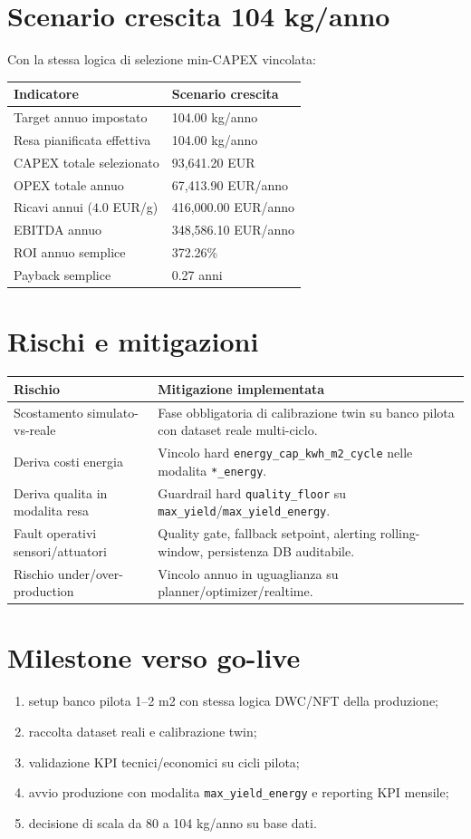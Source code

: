 \documentclass[11pt,a4paper]{article}
\begin{document}
\section*{Scenario crescita 104 kg/anno}
Con la stessa logica di selezione min-CAPEX vincolata:
\begin{longtable}{@{}p{6.6cm}p{5.6cm}@{}}
\toprule
Indicatore & Scenario crescita \\ \midrule
Target annuo impostato & 104.00 kg/anno \\
Resa pianificata effettiva & 104.00 kg/anno \\
CAPEX totale selezionato & 93,641.20 EUR \\
OPEX totale annuo & 67,413.90 EUR/anno \\
Ricavi annui (\(4.0\) EUR/g) & 416,000.00 EUR/anno \\
EBITDA annuo & 348,586.10 EUR/anno \\
ROI annuo semplice & 372.26\% \\
Payback semplice & 0.27 anni \\
\bottomrule
\end{longtable}

\section*{Rischi e mitigazioni}
\begin{longtable}{@{}p{4.0cm}p{7.8cm}@{}}
\toprule
Rischio & Mitigazione implementata \\ \midrule
Scostamento simulato-vs-reale & Fase obbligatoria di calibrazione twin su banco pilota con dataset reale multi-ciclo. \\
Deriva costi energia & Vincolo hard \texttt{energy\_cap\_kwh\_m2\_cycle} nelle modalita \texttt{*\_energy}. \\
Deriva qualita in modalita resa & Guardrail hard \texttt{quality\_floor} su \texttt{max\_yield}/\texttt{max\_yield\_energy}. \\
Fault operativi sensori/attuatori & Quality gate, fallback setpoint, alerting rolling-window, persistenza DB auditabile. \\
Rischio under/over-production & Vincolo annuo in uguaglianza su planner/optimizer/realtime. \\
\bottomrule
\end{longtable}

\section*{Milestone verso go-live}
\begin{enumerate}
  \item setup banco pilota 1--2 m2 con stessa logica DWC/NFT della produzione;
  \item raccolta dataset reali e calibrazione twin;
  \item validazione KPI tecnici/economici su cicli pilota;
  \item avvio produzione con modalita \texttt{max\_yield\_energy} e reporting KPI mensile;
  \item decisione di scala da 80 a 104 kg/anno su base dati.
\end{enumerate}
\end{document}
